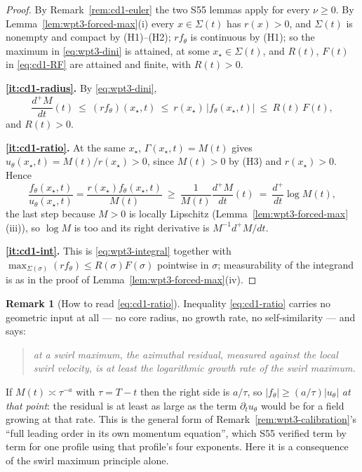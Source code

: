 \documentclass[11pt]{article}
\theoremstyle{definition}
\newtheorem{remark}[theorem]{Remark}
\theoremstyle{remark}
\newcommand{\abs}[1]{\left|#1\right|}
\begin{document}
\begin{proof}
  By Remark~\ref{rem:cd1-euler} the two S55 lemmas apply for every
  $\nu\geq0$. By Lemma~\ref{lem:wpt3-forced-max}(i) every $x\in\Sigma(t)$ has
  $r(x)>0$, and $\Sigma(t)$ is nonempty and compact by (H1)--(H2); $rf_\theta$
  is continuous by (H1); so the maximum in \eqref{eq:wpt3-dini} is attained,
  at some $x_\star\in\Sigma(t)$, and $R(t)$, $F(t)$ in \eqref{eq:cd1-RF} are
  attained and finite, with $R(t)>0$.

  \textbf{\ref{it:cd1-radius}.} By \eqref{eq:wpt3-dini},
  \[
    \frac{d^{+}M}{dt}(t)\ \leq\ (rf_\theta)(x_\star,t)
      \ \leq\ r(x_\star)\,\abs{f_\theta(x_\star,t)}
      \ \leq\ R(t)\,F(t),
  \]
  and $R(t)>0$.

  \textbf{\ref{it:cd1-ratio}.} At the same $x_\star$, $\Gamma(x_\star,t)=M(t)$
  gives $u_\theta(x_\star,t)=M(t)/r(x_\star)>0$, since $M(t)>0$ by (H3) and
  $r(x_\star)>0$. Hence
  \[
    \frac{f_\theta(x_\star,t)}{u_\theta(x_\star,t)}
      =\frac{r(x_\star)f_\theta(x_\star,t)}{M(t)}
      \ \geq\ \frac{1}{M(t)}\frac{d^{+}M}{dt}(t)
      \ =\ \frac{d^{+}}{dt}\log M(t),
  \]
  the last step because $M>0$ is locally Lipschitz
  (Lemma~\ref{lem:wpt3-forced-max}(iii)), so $\log M$ is too and its right
  derivative is $M^{-1}d^{+}M/dt$.

  \textbf{\ref{it:cd1-int}.} This is \eqref{eq:wpt3-integral} together with
  $\max_{\Sigma(\sigma)}(rf_\theta)\leq R(\sigma)F(\sigma)$ pointwise in
  $\sigma$; measurability of the integrand is as in the proof of
  Lemma~\ref{lem:wpt3-forced-max}(iv).
\end{proof}

\begin{remark}[How to read \eqref{eq:cd1-ratio}]\label{rem:cd1-read}
  Inequality \eqref{eq:cd1-ratio} carries no geometric input at all --- no
  core radius, no growth rate, no self-similarity --- and says:
  \begin{quote}
    \emph{at a swirl maximum, the azimuthal residual, measured against the
    local swirl velocity, is at least the logarithmic growth rate of the
    swirl maximum.}
  \end{quote}
  If $M(t)\asymp\tau^{-a}$ with $\tau=T-t$ then the right side is $a/\tau$,
  so $\abs{f_\theta}\geq(a/\tau)\abs{u_\theta}$ \emph{at that point}: the
  residual is at least as large as the term $\partial_tu_\theta$ would be for
  a field growing at that rate. This is the general form of
  Remark~\ref{rem:wpt3-calibration}'s ``full leading order in its own
  momentum equation'', which S55 verified term by term for one profile using
  that profile's four exponents. Here it is a consequence of the swirl
  maximum principle alone.
\end{remark}
\end{document}
